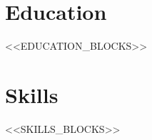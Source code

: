 \documentclass[a4paper,12pt]{article}
\begin{document}
\section{Education}
<<EDUCATION_BLOCKS>>

\section{Skills}
<<SKILLS_BLOCKS>>

\vfill
{}
\end{document}
